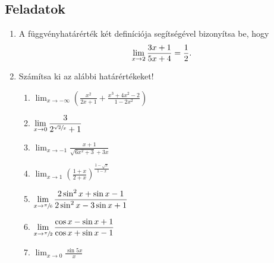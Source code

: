 \documentclass[a4paper, 12pt]{scrartcl}
\begin{document}
\clearpage
\subsection{Feladatok}

\begin{enumerate}
  \item A függvényhatárérték két definíciója segítségével bizonyítsa be, hogy
        \[
          \lim_{x \rightarrow 2} \frac{3x + 1}{5x + 4} = \frac12
          \text.
        \]

  \item Számítsa ki az alábbi határértékeket!
        \begin{multicols}{2}
          \begin{enumerate}
            \item $\displaystyle
                    \lim_{x \rightarrow -\infty} \left(
                    \frac{x^2}{2x + 1} +
                    \frac{x^3 + 4x^2 - 2}{1 - 2x^2}
                    \right)
                  $

            \item $\displaystyle
                    \lim_{x \rightarrow 0} \frac{3}{2^{\sfrac{\sqrt2}{x}} + 1}
                  $


            \item $\displaystyle
                    \lim_{x \rightarrow -1} \frac{x + 1}{\sqrt{6x^2 + 3} + 3x}
                  $

            \item $\displaystyle
                    \lim_{x \rightarrow 1} \left(
                    \frac{1 + x}{2 + x}
                    \right)^{\frac{1 - \sqrt x}{1 - x}}
                  $

            \item $\displaystyle
                    \lim_{x \rightarrow \sfrac{\pi}{6}} \frac{
                      2 \sin^2 x + \sin x - 1
                    }{
                      2 \sin^2 x - 3 \sin x + 1
                    }
                  $

            \item $\displaystyle
                    \lim_{x \rightarrow \sfrac{\pi}{2}} \frac{
                      \cos x - \sin x + 1
                    }{
                      \cos x + \sin x - 1
                    }
                  $

            \item $\displaystyle
                    \lim_{x \rightarrow 0} \frac{\sin 5x}{x}
                  $


\end{enumerate}
\end{multicols}
\end{enumerate}
\end{document}
